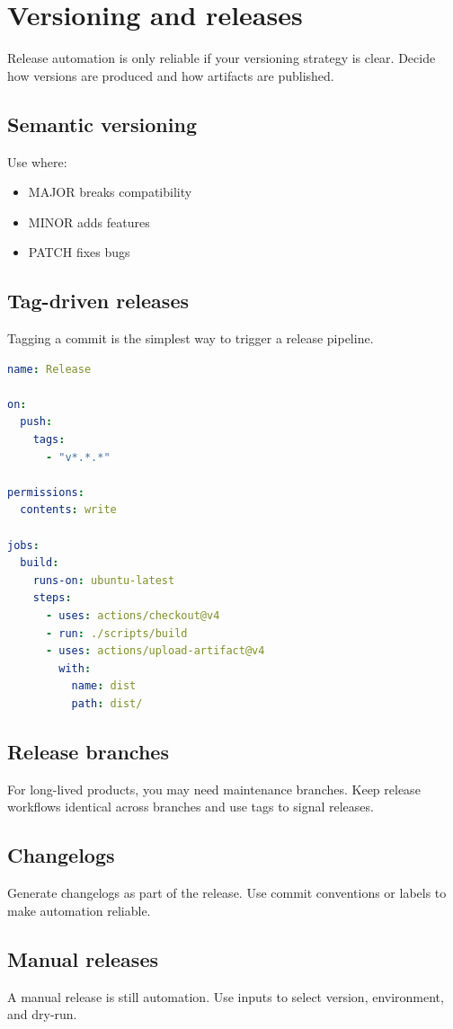 \chapter{Versioning and releases}

Release automation is only reliable if your versioning strategy is clear.
Decide how versions are produced and how artifacts are published.

\section{Semantic versioning}
Use  where:
\begin{itemize}[nosep]
  \item MAJOR breaks compatibility
  \item MINOR adds features
  \item PATCH fixes bugs
\end{itemize}

\section{Tag-driven releases}
Tagging a commit is the simplest way to trigger a release pipeline.

\begin{lstlisting}[language=YAML]
name: Release

on:
  push:
    tags:
      - "v*.*.*"

permissions:
  contents: write

jobs:
  build:
    runs-on: ubuntu-latest
    steps:
      - uses: actions/checkout@v4
      - run: ./scripts/build
      - uses: actions/upload-artifact@v4
        with:
          name: dist
          path: dist/
\end{lstlisting}

\section{Release branches}
For long-lived products, you may need maintenance branches.
Keep release workflows identical across branches and use tags to signal releases.

\section{Changelogs}
Generate changelogs as part of the release.
Use commit conventions or labels to make automation reliable.

\section{Manual releases}
A manual release is still automation.
Use  inputs to select version, environment, and dry-run.

